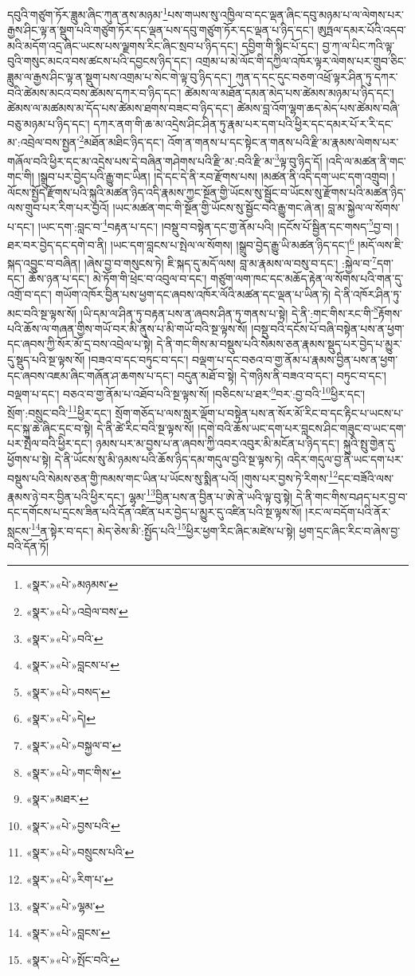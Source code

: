 དབུའི་གཙུག་ཏོར་ཟླུམ་ཞིང་ཀུན་ནས་མཉམ་\footnote{«སྣར་»«པེ་»མཉམས་}པས་གཡས་སུ་འཁྱིལ་བ་དང་ལྡན་ཞིང་དབུ་མཉམ་པ་ལ་ལེགས་པར་རྒྱས་ཤིང་ལྟ་ན་སྡུག་པའི་གཙུག་ཏོར་དང་ལྡན་པས་དབུ་གཙུག་ཏོར་དང་ལྡན་པ་ཉིད་དང་། ཨུཏྤལ་དམར་པོའི་འདབ་མའི་མདོག་འདྲ་ཞིང་ཡངས་པས་ལྗགས་རིང་ཞིང་སྲབ་པ་ཉིད་དང་། དབྱིག་གི་སྙིང་པོ་དང་། བྱ་ཀ་ལ་པིང་ཀའི་ལྟ་བུའི་གསུང་མངའ་བས་ཚངས་པའི་དབྱངས་ཉིད་དང་། འགྲམ་པ་མེ་ལོང་གི་དཀྱིལ་འཁོར་ལྟར་ལེགས་པར་གྲུབ་ཅིང་ཟླུམ་ལ་རྒྱས་ཤིང་ལྟ་ན་སྡུག་པས་འགྲམ་པ་སེང་གེ་ལྟ་བུ་ཉིད་དང་། ཀུན་ད་དང་དུང་བཅག་འཕྲོ་ལྟར་ཤིན་ཏུ་དཀར་བའི་ཚེམས་མངའ་བས་ཚེམས་དཀར་བ་ཉིད་དང་། ཚེམས་ལ་མཐོན་དམན་མེད་པས་ཚེམས་མཉམ་པ་ཉིད་དང་། ཚེམས་ལ་མཚམས་མ་དོད་པས་ཚེམས་ཐགས་བཟང་བ་ཉིད་དང་། ཚེམས་བླ་འོག་ལྷག་ཆད་མེད་པས་ཚེམས་བཞི་བཅུ་མཉམ་པ་ཉིད་དང་། དཀར་ནག་གི་ཆ་མ་འདྲེས་ཤིང་ཤིན་ཏུ་རྣམ་པར་དག་པའི་ཕྱིར་དང་དམར་པོ་ར་རི་དང་མ་:འབྲེལ་བས་སྤྱན་\footnote{«སྣར་»«པེ་»འབྲེལ་བས་}མཐོན་མཐིང་ཉིད་དང་། འོག་ན་གནས་པ་དང་སྟེང་ན་གནས་པའི་རྫི་མ་རྣམས་ལེགས་པར་གཞོལ་བའི་ཕྱིར་དང་མ་འདྲེས་པས་དེ་བཞིན་གཤེགས་པའི་རྫི་མ་:བའི་རྫི་མ་\footnote{«སྣར་»«པེ་»བའི་}ལྟ་བུ་ཉིད་དོ། །འདི་ལ་མཚན་ནི་གང་གང་གི། །སྒྲུབ་པར་བྱེད་པའི་རྒྱུ་གང་ཡིན། །དེ་དང་དེ་ནི་རབ་རྫོགས་པས། །མཚན་ནི་འདི་དག་ཡང་དག་འགྲུབ། །ལོངས་སྤྱོད་རྫོགས་པའི་སྐུའི་མཚན་ཉིད་འདི་རྣམས་ཀྱང་སྔོན་གྱི་ཡོངས་སུ་སྦྱོང་བ་ཡོངས་སུ་རྫོགས་པའི་མཚན་ཉིད་ལས་གྲུབ་པར་རིག་པར་བྱའོ། །ཡང་མཚན་གང་གི་སྔོན་གྱི་ཡོངས་སུ་སྦྱོང་བའི་རྒྱུ་གང་ཞེ་ན། བླ་མ་སྐྱེལ་ལ་སོགས་པ་དང་། །ཡང་དག་:བླང་བ་\footnote{«སྣར་»«པེ་»བླངས་པ་}བརྟན་པ་དང་། །བསྡུ་བ་བསྟེན་དང་གྱ་ནོམ་པའི། །དངོས་པོ་སྦྱིན་དང་གསད་\footnote{«སྣར་»«པེ་»བསད་}བྱ་བ། །ཐར་བར་བྱེད་དང་དགེ་བ་ནི། །ཡང་དག་བླངས་པ་སྤེལ་ལ་སོགས། །སྒྲུབ་བྱེད་རྒྱུ་ཡི་མཚན་ཉིད་དང་།\footnote{«སྣར་»«པེ་»དེ།} །མདོ་ལས་ཇི་སྐད་འབྱུང་བ་བཞིན། །ཞེས་བྱ་བ་གསུངས་ཏེ། ཇི་སྐད་དུ་མདོ་ལས། བླ་མ་རྣམས་ལ་བསུ་བ་དང་། :སྐྱེལ་བ་\footnote{«སྣར་»«པེ་»བསྐྱལ་བ་}དག་དང་། ཆོས་ཉན་པ་དང་། མེ་ཏོག་གི་ཕྲེང་བ་འབུལ་བ་དང་། གཙུག་ལག་ཁང་དང་མཆོད་རྟེན་ལ་སོགས་པའི་གན་དུ་འགྲོ་བ་དང་། གཡོག་འཁོར་བྱིན་པས་ཕྱག་དང་ཞབས་འཁོར་ལོའི་མཚན་དང་ལྡན་པ་ཡིན་ཏེ། དེ་ནི་འཁོར་ཤིན་ཏུ་མང་བའི་སྔ་ལྟས་སོ། །ཡི་དམ་ལ་ཤིན་ཏུ་བརྟན་པས་ན་ཞབས་ཤིན་ཏུ་གནས་པ་སྟེ། དེ་ནི་:གང་གིས་རང་གི་\footnote{«སྣར་»«པེ་»གང་གིས་}རྟོགས་པའི་ཆོས་ལ་གཞན་གྱིས་གཡོ་བར་མི་ནུས་པ་མི་གཡོ་བའི་སྔ་ལྟས་སོ། །བསྡུ་བའི་དངོས་པོ་བཞི་བསྟེན་པས་ན་ཕྱག་དང་ཞབས་ཀྱི་སོར་མོ་དྲ་བས་འབྲེལ་པ་སྟེ། དེ་ནི་གང་གིས་མ་བསྡུས་པའི་སེམས་ཅན་རྣམས་སྡུད་པར་བྱེད་པ་མྱུར་དུ་སྡུད་པའི་སྔ་ལྟས་སོ། །བཟའ་བ་དང་བཏུང་བ་དང་། བལྡག་པ་དང་བཅའ་བ་གྱ་ནོམ་པ་རྣམས་བྱིན་པས་ན་ཕྱག་དང་ཞབས་འཇམ་ཞིང་གཞོན་ཤ་ཆགས་པ་དང་། བདུན་མཐོ་བ་སྟེ། དེ་གཉིས་ནི་བཟའ་བ་དང་། བཏུང་བ་དང་། བལྡག་པ་དང་། བཅའ་བ་གྱ་ནོམ་པ་འཐོབ་པའི་སྔ་ལྟས་སོ། །བཅིངས་པ་ཐར་\footnote{«སྣར་»མཐར་}བར་:བྱ་བའི་\footnote{«སྣར་»«པེ་»བྱས་པའི་}ཕྱིར་དང་། སྲོག་:བསྲུང་བའི་\footnote{«སྣར་»«པེ་»བསྲུངས་པའི་}ཕྱིར་དང་། སྲོག་གཅོད་པ་ལས་སླར་ལྡོག་པ་བསྟེན་པས་ན་སོར་མོ་རིང་བ་དང་རྟིང་པ་ཡངས་པ་དང་སྐུ་ཆེ་ཞིང་དྲང་བ་སྟེ། དེ་ནི་ཚེ་རིང་བའི་སྔ་ལྟས་སོ། །དགེ་བའི་ཆོས་ཡང་དག་པར་བླངས་ཤིང་གཟུང་བ་ཡང་དག་པར་སྤེལ་བའི་ཕྱིར་དང་། ཉམས་པར་མ་བྱས་པ་ན་ཞབས་ཀྱི་འབར་འབུར་མི་མངོན་པ་ཉིད་དང་། སྐུའི་སྤུ་གྱེན་དུ་ཕྱོགས་པ་སྟེ། དེ་ནི་ཡོངས་སུ་མི་ཉམས་པའི་ཆོས་ཉིད་དམ་གདུལ་བྱའི་སྔ་ལྟས་ཏེ། འདིར་གདུལ་བྱ་ནི་ཡང་དག་པར་བསྡུས་པའི་སེམས་ཅན་གྱི་ཁམས་གང་ཡིན་པ་ཡོངས་སུ་སྨིན་པའོ། །གུས་པར་བྱས་ཏེ་རིགས་\footnote{«སྣར་»«པེ་»རིག་པ་}དང་བཟོའི་ལས་རྣམས་ཉེ་བར་བྱིན་པའི་ཕྱིར་དང་། ལྷྭམ་\footnote{«སྣར་»«པེ་»ལྷམ་}བྱིན་པས་ན་བྱིན་པ་ཨེ་ནེ་ཡའི་ལྟ་བུ་སྟེ། དེ་ནི་གང་གིས་བཤད་པར་བྱ་བ་དང་དགོངས་པ་དྲངས་ཟིན་པའི་དོན་འཛིན་པར་བྱེད་པ་མྱུར་དུ་འཛིན་པའི་སྔ་ལྟས་སོ། །རང་ལ་བདོག་པའི་ནོར་སླངས་\footnote{«སྣར་»«པེ་»བླངས་}ན་སྟེར་བ་དང་། མེད་ཅེས་མི་:སྤྱོད་པའི་\footnote{«སྣར་»«པེ་»སྤོང་བའི་}ཕྱིར་ཕྱག་རིང་ཞིང་མཛེས་པ་སྟེ། ཕྱག་དྲང་ཞིང་རིང་བ་ཞེས་བྱ་བའི་དོན་ཏོ། 